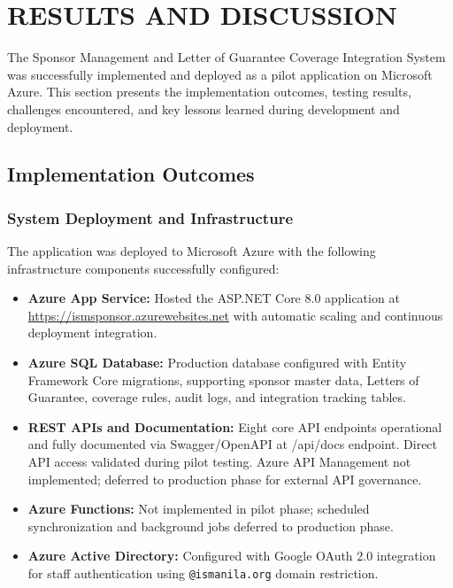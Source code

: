 
\section{RESULTS AND DISCUSSION}

The Sponsor Management and Letter of Guarantee Coverage Integration System was successfully implemented and deployed as a pilot application on Microsoft Azure. This section presents the implementation outcomes, testing results, challenges encountered, and key lessons learned during development and deployment.

\subsection{Implementation Outcomes}

\subsubsection{System Deployment and Infrastructure}

The application was deployed to Microsoft Azure with the following infrastructure components successfully configured:

\begin{itemize}
    \item \textbf{Azure App Service:} Hosted the ASP.NET Core 8.0 application at \url{https://ismsponsor.azurewebsites.net} with automatic scaling and continuous deployment integration.
    \item \textbf{Azure SQL Database:} Production database configured with Entity Framework Core migrations, supporting sponsor master data, Letters of Guarantee, coverage rules, audit logs, and integration tracking tables.
    \item \textbf{REST APIs and Documentation:} Eight core API endpoints operational and fully documented via Swagger/OpenAPI at /api/docs endpoint. Direct API access validated during pilot testing. Azure API Management not implemented; deferred to production phase for external API governance.
    \item \textbf{Azure Functions:} Not implemented in pilot phase; scheduled synchronization and background jobs deferred to production phase.
    \item \textbf{Azure Active Directory:} Configured with Google OAuth 2.0 integration for staff authentication using \texttt{@ismanila.org} domain restriction.
\end{itemize}

